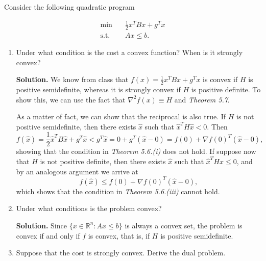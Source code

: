 \item Consider the following quadratic program

  \[
    \begin{aligned}
      \min \quad & \frac{1}{2}x^T B x + g^T x \\
      \textrm{s.t.} \quad & Ax \le b.
    \end{aligned}
  \]

  \begin{enumerate}[label=(\alph*)]
    \item Under what condition is the cost a convex function? When is it
      strongly convex?

      \medskip\textbf{Solution.} We know from class that $f(x) = \frac{1}{2}x^T
      B x + g^T x$ is convex if $H$ is positive semidefinite, whereas it is
      strongly convex if $H$ is positive definite. To show this, we can use the
      fact that $\nabla ^2 f(x) \equiv H$ and \textit{Theorem 5.7}.

      As a matter of fact, we can show that the reciprocal is also true. If $H$
      is not positive semidefinite, then there exists $\hat{x}$ such that
      $\hat{x}^T H \hat{x} < 0$. Then 
      \[
      f(\hat{x}) = \frac{1}{2} \hat{x}^T B \hat{x} + g^T \hat{x} <
      g^T \hat{x} =
      0 + g^T(\hat{x} - 0) =
      f(0) + \nabla f(0)^T(\hat{x}-0)
      ,\] 
      showing that the condition in \textit{Theorem 5.6.(i)} does not hold. If
      suppose now that $H$ is not positive definite, then there exists $\hat{x}$
      such that $\hat{x}^T H \hat{x} \le 0$, and by an analogous argument we
      arrive at
      \[
      f(\hat{x}) \le 
      f(0) + \nabla f(0)^T(\hat{x}-0)
      ,\]
      which shows that the condition in \textit{Theorem 5.6.(iii)} cannot hold.

    \item Under what conditions is the problem convex?

      \medskip\textbf{Solution.} Since $\{x\in \mathbb{R}^n : Ax\le b\}$ is
      always a convex set, the problem is convex if and only if $f$ is convex,
      that is, if $H$ is positive semidefinite.

    \item Suppose that the cost is strongly convex. Derive the dual problem.


\end{enumerate}
